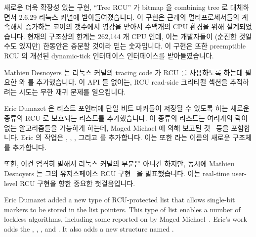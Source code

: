 새로운 더욱 확장성 있는 구현, ``Tree RCU'' 가 bitmap 을 combining tree 로
대체하면서 2.6.29 리눅스 커널에 받아들여졌습니다.
이 구현은 근래의 멀티프로세서들의 계속해서 증가하는 코어의 갯수에서 영감을
받아서 수백개의 CPU 환경을 위해 설계되었습니다.
현재의 구조상의 한계는 262,144 개 CPU 인데, 이는 개발자들이 (순진한 것일 수도
있지만) 한동안은 충분할 것이라 믿는 숫자입니다.
이 구현은 또한 preemptible RCU 의 개선된 dynamic-tick 인터페이스 인터페이스를
받아들였습니다.

Mathieu Desnoyers 는 리눅스 커널의 tracing code 가 RCU 를 사용하도록 하는데
필요한  와
 를 추가했습니다.
이 API 들 없이는, RCU read-side 크리티컬 섹션을 추적하려는 시도는 무한 재귀
문제를 일으킵니다.

Eric Dumazet 은 리스트 포인터에 단일 비트 마커들이 저장될 수 있도록 하는 새로운
종류의 RCU 로 보호되는 리스트를 추가했습니다.
이 종류의 리스트는 여러개의 락이 없는 알고리즘들을 가능하게 하는데, Maged
Michael 에 의해 보고된 것~\cite{MagedMichael04a} 등을 포함합니다.
Eric 의 작업은 , ,
, 그리고 
를 추가합니다.
이는 또한  라는 이름의 새로운 구조체를 추가합니다.

또한, 이건 엄격히 말해서 리눅스 커널의 부분은 아니긴 하지만, 동시에 Mathieu
Desnoyers 는 그의 유저스페이스 RCU 구현~\cite{MathieuDesnoyers2009URCU} 을
발표했습니다.
이는 real-time user-level RCU 구현을 향한 중요한 첫걸음입니다.
\iffalse

Eric Dumazet added a new type of RCU-protected list that allows single-bit
markers to be stored in the list pointers.
This type of list enables a number of lockless algorithms, including
some reported on by Maged Michael~\cite{MagedMichael04a}.
Eric's work adds the ,
, , and
.
It also adds a new structure named .

